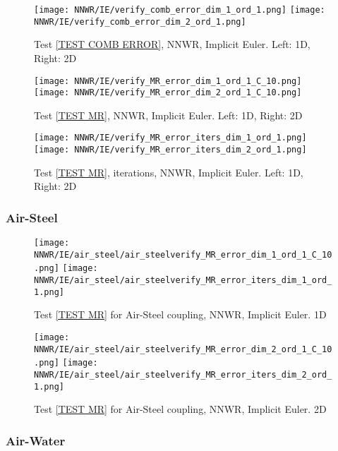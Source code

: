 \documentclass[a4paper,10pt]{article}
\begin{document}
\begin{figure}[!ht]
\texttt{[image: NNWR/IE/verify\_comb\_error\_dim\_1\_ord\_1.png]}
\texttt{[image: NNWR/IE/verify\_comb\_error\_dim\_2\_ord\_1.png]}
\caption{Test \ref{TEST COMB ERROR}, NNWR, Implicit Euler. Left: 1D, Right: 2D}
\label{FIG NNWR IE COMB ERROR}
\end{figure}

\begin{figure}[!ht]
\texttt{[image: NNWR/IE/verify\_MR\_error\_dim\_1\_ord\_1\_C\_10.png]}
\texttt{[image: NNWR/IE/verify\_MR\_error\_dim\_2\_ord\_1\_C\_10.png]}
\caption{Test \ref{TEST MR}, NNWR, Implicit Euler. Left: 1D, Right: 2D}
\label{FIG NNWR IE MR ERROR}
\end{figure}

\begin{figure}[!ht]
\texttt{[image: NNWR/IE/verify\_MR\_error\_iters\_dim\_1\_ord\_1.png]}
\texttt{[image: NNWR/IE/verify\_MR\_error\_iters\_dim\_2\_ord\_1.png]}
\caption{Test \ref{TEST MR}, iterations, NNWR, Implicit Euler. Left: 1D, Right: 2D}
\label{FIG NNWR IE MR ITERS}
\end{figure}
% 
\FloatBarrier
\subsubsection{Air-Steel}\label{SEC NNWR IE AIR STEEL}
%

\begin{figure}[!ht]
\texttt{[image: NNWR/IE/air\_steel/air\_steelverify\_MR\_error\_dim\_1\_ord\_1\_C\_10.png]}
\texttt{[image: NNWR/IE/air\_steel/air\_steelverify\_MR\_error\_iters\_dim\_1\_ord\_1.png]}
\caption{Test \ref{TEST MR} for Air-Steel coupling, NNWR, Implicit Euler. 1D}
\label{FIG NNWR IE AIR STEEL 1D}
\end{figure}

\begin{figure}[!ht]
\texttt{[image: NNWR/IE/air\_steel/air\_steelverify\_MR\_error\_dim\_2\_ord\_1\_C\_10.png]}
\texttt{[image: NNWR/IE/air\_steel/air\_steelverify\_MR\_error\_iters\_dim\_2\_ord\_1.png]}
\caption{Test \ref{TEST MR} for Air-Steel coupling, NNWR, Implicit Euler. 2D}
\label{FIG NNWR IE AIR STEEL 2D}
\end{figure}

\FloatBarrier
\subsubsection{Air-Water}\label{SEC NNWR IE AIR WATER}
% 
\end{document}
